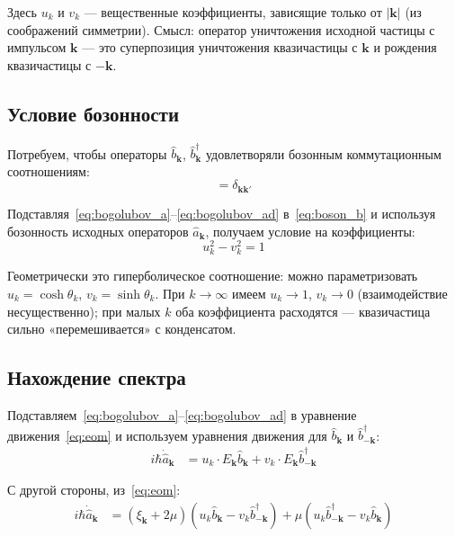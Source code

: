 \documentclass[../general/general]{subfiles}
\begin{document}
Здесь $u_k$ и $v_k$ --- вещественные коэффициенты, зависящие только от $|\mathbf{k}|$ (из соображений симметрии). Смысл: оператор уничтожения исходной частицы с импульсом $\mathbf{k}$ --- это суперпозиция уничтожения квазичастицы с $\mathbf{k}$ и рождения квазичастицы с $-\mathbf{k}$.

\subsection{Условие бозонности}

Потребуем, чтобы операторы $\hat{b}_\mathbf{k}$, $\hat{b}^\dagger_\mathbf{k}$ удовлетворяли бозонным коммутационным соотношениям:
\begin{equation}
    [\hat{b}_\mathbf{k},\,\hat{b}^\dagger_{\mathbf{k}'}] = \delta_{\mathbf{k}\mathbf{k}'}
    \label{eq:boson_b}
\end{equation}

Подставляя~\eqref{eq:bogolubov_a}--\eqref{eq:bogolubov_ad} в~\eqref{eq:boson_b} и используя бозонность исходных операторов $\hat{a}_\mathbf{k}$, получаем условие на коэффициенты:
\begin{equation}
    \boxed{u_k^2 - v_k^2 = 1}
    \label{eq:uv_condition}
\end{equation}

Геометрически это гиперболическое соотношение: можно параметризовать $u_k = \cosh\theta_k$, $v_k = \sinh\theta_k$. При $k \to \infty$ имеем $u_k \to 1$, $v_k \to 0$ (взаимодействие несущественно); при малых $k$ оба коэффициента расходятся — квазичастица сильно «перемешивается» с конденсатом.

\subsection{Нахождение спектра}

Подставляем~\eqref{eq:bogolubov_a}--\eqref{eq:bogolubov_ad} в уравнение движения~\eqref{eq:eom} и используем уравнения движения для $\hat{b}_\mathbf{k}$ и $\hat{b}^\dagger_{-\mathbf{k}}$:
\begin{align}
    i\hbar\dot{\hat{a}}_\mathbf{k} &= u_k\cdot E_\mathbf{k}\hat{b}_\mathbf{k} + v_k\cdot E_\mathbf{k}\hat{b}^\dagger_{-\mathbf{k}}
\end{align}

С другой стороны, из~\eqref{eq:eom}:
\begin{align}
    i\hbar\dot{\hat{a}}_\mathbf{k} &= (\xi_\mathbf{k}+2\mu)(u_k\hat{b}_\mathbf{k} - v_k\hat{b}^\dagger_{-\mathbf{k}})
    + \mu(u_k\hat{b}^\dagger_{-\mathbf{k}} - v_k\hat{b}_\mathbf{k})
\end{align}
\end{document}
